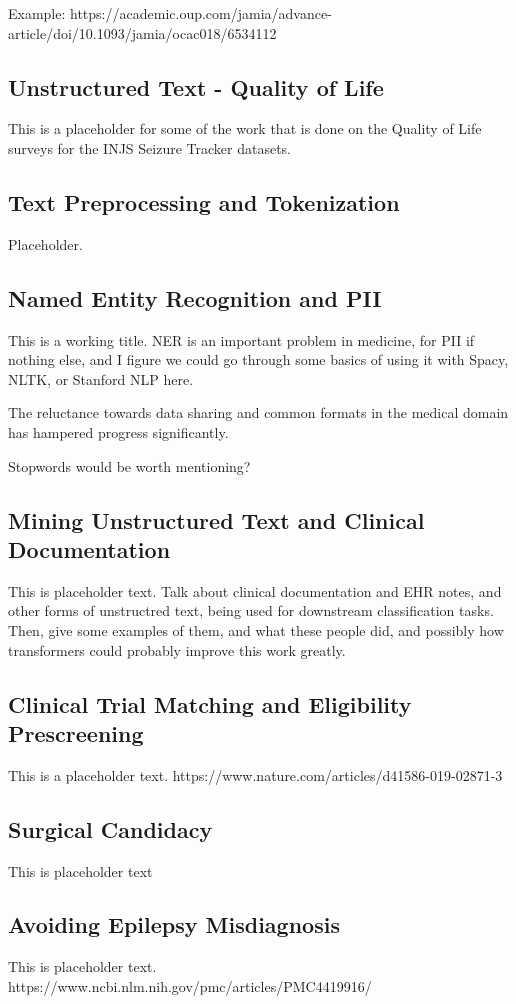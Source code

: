 Example:
https://academic.oup.com/jamia/advance-article/doi/10.1093/jamia/ocac018/6534112

\subsection{Unstructured Text - Quality of Life}
This is a placeholder for some of the work that is done on the Quality of Life surveys for the INJS Seizure Tracker datasets.

\subsection{Text Preprocessing and Tokenization}

Placeholder.

\subsection{Named Entity Recognition and PII}

This is a working title. NER is an important problem in medicine, for PII if nothing else, and I figure we could go through some basics of using it with Spacy, NLTK, or Stanford NLP here.

The reluctance towards data sharing and common formats in the medical domain has hampered progress significantly.

Stopwords would be worth mentioning?

\subsection{Mining Unstructured Text and Clinical Documentation}



This is placeholder text. Talk about clinical documentation and EHR notes, and other forms of unstructred text, being used for downstream classification tasks.
Then, give some examples of them, and what these people did, and possibly how transformers could probably improve this work greatly.

\subsection{Clinical Trial Matching and Eligibility Prescreening}

This is a placeholder text. https://www.nature.com/articles/d41586-019-02871-3

\subsection{Surgical Candidacy}

This is placeholder text

\subsection{Avoiding Epilepsy Misdiagnosis}

This is placeholder text. https://www.ncbi.nlm.nih.gov/pmc/articles/PMC4419916/



